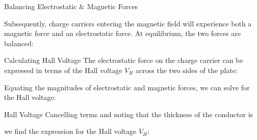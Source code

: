 \documentclass[12pt,aspectratio=169]{beamer}
\begin{document}
\begin{frame}{Balancing Electrostatic \& Magnetic Forces}
  \begin{center}
  \end{center}
  Subsequently, charge carriers entering the magnetic field will experience
  both a magnetic force and an electrostatic force. At equilibrium, the two
  forces are balanced:

\end{frame}



\begin{frame}{Calculating Hall Voltage}
  The electrostatic force on the charge carrier can be expressed in terms of
  the Hall voltage $V_H$ across the two sides of the plate:

  
  Equating the magnitudes of electrostatic and magnetic forces, we can solve
  for the Hall voltage:

\end{frame}


\begin{frame}{Hall Voltage}
  Cancelling terms and noting that the thickness of the conductor is


  we find the expression for the Hall voltage $V_H$:

\end{frame}
\end{document}
